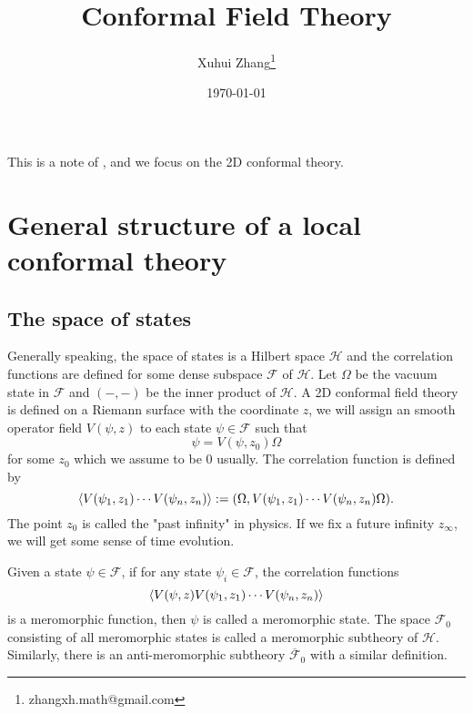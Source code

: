 \documentclass[10pt,reqno,draft]{article}
\title{Conformal Field Theory}
\author[1]{Xuhui Zhang\thanks{zhangxh.math@gmail.com}}
\affil[1]{Department of Mathematical Science, Tsinghua University}
\date{\today}
\numberwithin{equation}{section}
\numberwithin{figure}{section}
\numberwithin{table}{section}
\theoremstyle{plain}
\theoremstyle{definition}
\theoremstyle{remark}
\begin{document}
    \maketitle
	This is a note of \cite{gaberdielIntroductionConformalField2000}, and we focus on the 2D conformal theory.
	\section{General structure of a local conformal theory}
	\subsection{The space of states}
	Generally speaking, the space of states is a Hilbert space \(\mathcal{H}\) and the correlation functions are defined for some dense subspace \(\mathcal{F}\) of \(\mathcal{H}\). Let \(\Omega\) be the vacuum state in \(\mathcal{F}\) and \((-,-)\) be the inner product of \(\mathcal{H}\). A 2D conformal field theory is defined on a Riemann surface with the coordinate \(z\), we will assign an smooth operator field \(V(\psi,z)\) to each state \(\psi\in \mathcal{F}\) such that 
	\begin{equation}
	  \psi=V(\psi,z_{0})\Omega 
	\end{equation}
	for some \(z_0\) which we assume to be 0 usually. The correlation function is defined by
	\begin{equation}
		\braket{V(\psi_1,z_1)\cdots V(\psi_{n},z_{n})}:=(\Omega,V(\psi_1,z_1)\cdots V(\psi_{n},z_{n})\Omega).
	\end{equation}
	The point \(z_0\) is called the "past infinity" in physics. If we fix a future infinity \(z_{\infty}\), we will get some sense of time evolution. 

	Given a state \(\psi\in \mathcal{F}\), if for any state \(\psi_{i}\in \mathcal{F}\), the correlation functions 
	\begin{equation}
		\braket{V(\psi,z)V(\psi_1,z_1)\cdots V(\psi_{n},z_{n})}
	\end{equation}
	is a meromorphic function, then \(\psi\) is called a meromorphic state. The space \(\mathcal{F}_{0}\) consisting of all meromorphic states is called a meromorphic subtheory of \(\mathcal{H}\). Similarly, there is an anti-meromorphic subtheory \(\overline{\mathcal{F}}_{0}\) with a similar definition. 
\end{document}
